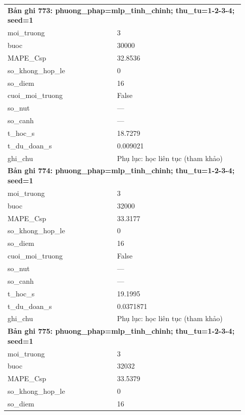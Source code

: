 \begin{longtable}{p{0.43\linewidth}p{0.50\linewidth}}
\midrule
\multicolumn{2}{p{0.95\linewidth}}{\textbf{Bản ghi 773: phuong\_phap=mlp\_tinh\_chinh; thu\_tu=1-2-3-4; seed=1}} \\
moi\_\allowbreak truong & 3 \\
buoc & 30000 \\
MAPE\_\allowbreak Csp & 32.8536 \\
so\_\allowbreak khong\_\allowbreak hop\_\allowbreak le & 0 \\
so\_\allowbreak diem & 16 \\
cuoi\_\allowbreak moi\_\allowbreak truong & False \\
so\_\allowbreak nut & — \\
so\_\allowbreak canh & — \\
t\_\allowbreak hoc\_\allowbreak s & 18.7279 \\
t\_\allowbreak du\_\allowbreak doan\_\allowbreak s & 0.009021 \\
ghi\_\allowbreak chu & Phụ lục: học liên tục (tham khảo) \\
\midrule
\multicolumn{2}{p{0.95\linewidth}}{\textbf{Bản ghi 774: phuong\_phap=mlp\_tinh\_chinh; thu\_tu=1-2-3-4; seed=1}} \\
moi\_\allowbreak truong & 3 \\
buoc & 32000 \\
MAPE\_\allowbreak Csp & 33.3177 \\
so\_\allowbreak khong\_\allowbreak hop\_\allowbreak le & 0 \\
so\_\allowbreak diem & 16 \\
cuoi\_\allowbreak moi\_\allowbreak truong & False \\
so\_\allowbreak nut & — \\
so\_\allowbreak canh & — \\
t\_\allowbreak hoc\_\allowbreak s & 19.1995 \\
t\_\allowbreak du\_\allowbreak doan\_\allowbreak s & 0.0371871 \\
ghi\_\allowbreak chu & Phụ lục: học liên tục (tham khảo) \\
\midrule
\multicolumn{2}{p{0.95\linewidth}}{\textbf{Bản ghi 775: phuong\_phap=mlp\_tinh\_chinh; thu\_tu=1-2-3-4; seed=1}} \\
moi\_\allowbreak truong & 3 \\
buoc & 32032 \\
MAPE\_\allowbreak Csp & 33.5379 \\
so\_\allowbreak khong\_\allowbreak hop\_\allowbreak le & 0 \\
so\_\allowbreak diem & 16 \\

\end{longtable}
